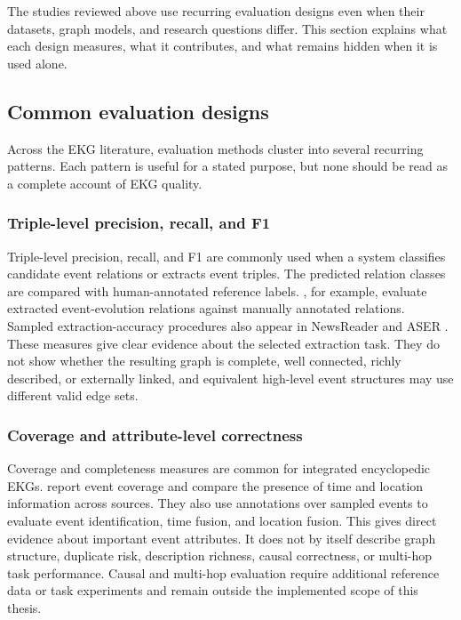 The studies reviewed above use recurring evaluation designs even when their datasets, graph models, and research questions differ. This section explains what each design measures, what it contributes, and what remains hidden when it is used alone.

\subsection{Common evaluation designs}

Across the EKG literature, evaluation methods cluster into several recurring patterns. Each pattern is useful for a stated purpose, but none should be read as a complete account of EKG quality.

\subsubsection{Triple-level precision, recall, and F1}

Triple-level precision, recall, and F1 are commonly used when a system classifies candidate event relations or extracts event triples. The predicted relation classes are compared with human-annotated reference labels. \citet{eventevolution2009}, for example, evaluate extracted event-evolution relations against manually annotated relations. Sampled extraction-accuracy procedures also appear in NewsReader and ASER \citep{newsreader2016,aser2019}. These measures give clear evidence about the selected extraction task. They do not show whether the resulting graph is complete, well connected, richly described, or externally linked, and equivalent high-level event structures may use different valid edge sets.

\subsubsection{Coverage and attribute-level correctness}

Coverage and completeness measures are common for integrated encyclopedic EKGs. \citet{eventkg2018} report event coverage and compare the presence of time and location information across sources. They also use annotations over sampled events to evaluate event identification, time fusion, and location fusion. This gives direct evidence about important event attributes. It does not by itself describe graph structure, duplicate risk, description richness, causal correctness, or multi-hop task performance. Causal and multi-hop evaluation require additional reference data or task experiments and remain outside the implemented scope of this thesis.

